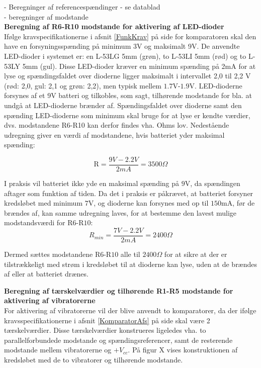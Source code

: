 - Beregninger af referencespændinger - se datablad \\
- beregninger af modstande \\


\noindent\textbf{Beregning af R6-R10 modstande for aktivering af LED-dioder} \\
Ifølge kravspecifikationerne i afsnit \ref{FunkKrav}  på side \pageref{FunkKrav} for komparatoren skal den have en forsyningsspænding på minimum 3V og maksimalt 9V. De anvendte LED-dioder i systemet er: en L-53LG 5mm (grøn), to L-53LI 5mm (rød) og to L-53LY 5mm (gul). Disse LED-dioder kræver en minimum spænding på 2mA for at lyse og spændingsfaldet over dioderne ligger maksimalt i intervallet 2,0 til 2,2 V (rød: 2,0, gul: 2,1 og grøn: 2,2), men typisk mellem $1.7$V-$1.9$V. LED-dioderne forsynes af et 9V batteri og tilkobles, som sagt, tilhørende modstande for bla. at undgå at LED-dioderne brænder af. Spændingsfaldet over dioderne samt den spænding LED-dioderne som minimum skal bruge for at lyse er kendte værdier, dvs. modstandene R6-R10 kan derfor findes vha. Ohms lov. Nedestående udregning giver en værdi af modstandene, hvis batteriet yder maksimal spænding:

\begin{equation}
\text{R} = \dfrac{9V - 2.2V}{2mA} = 3500\Omega
\end{equation}

\noindent I praksis vil batteriet ikke yde en maksimal spænding på $9$V, da spændingen aftager som funktion af tiden. Da det i praksis er påkrævet, at batteriet forsyner kredsløbet med minimum $7$V, og dioderne kan forsynes med op til $150$mA, før de brændes af, kan samme udregning laves, for at bestemme den lavest mulige modstandsværdi for R$6$-R$10$:
\begin{equation}
R_{min} = \dfrac{7V-2.2V}{2mA} = 2400\Omega
\end{equation}

\noindent Dermed sættes modstandene R$6$-R$10$ alle til $2400\Omega$ for at sikre at der er tilstrækkeligt med strøm i kredsløbet til at dioderne kan lyse, uden at de brændes af eller at batteriet drænes. 

\noindent\textbf{Beregning af tærskelværdier og tilhørende R1-R5 modstande for aktivering af  vibratorerne} \\
For aktivering af vibratorerne vil der blive anvendt to komparatorer, da der ifølge kravsspecifikationerne i afsnit \ref{KomparatorAfs} på side \pageref{KomparatorAfs} skal være 2 tærskelværdier. Disse tærskelværdier konstrueres ligeledes vha. to parallelforbundede modstande og spændingsreferencer, samt de resterende modstande mellem vibratorerne og $+V_{cc}$. På figur X vises konstruktionen af kredsløbet med de to vibratorer og tilhørende modstande. \\


